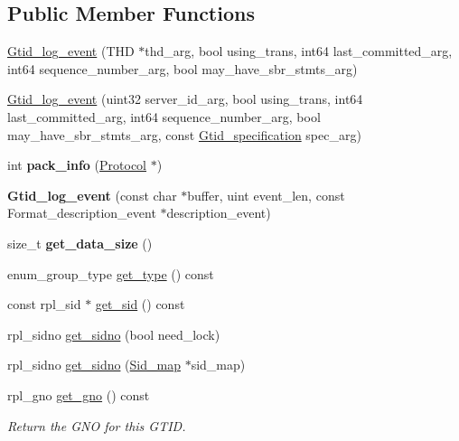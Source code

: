 \subsection*{Public Member Functions}
\begin{DoxyCompactItemize}
\item 
\mbox{\hyperlink{classGtid__log__event_af44a16a9c57f246d7b24ceae5fd6e12d}{Gtid\+\_\+log\+\_\+event}} (T\+HD $\ast$thd\+\_\+arg, bool using\+\_\+trans, int64 last\+\_\+committed\+\_\+arg, int64 sequence\+\_\+number\+\_\+arg, bool may\+\_\+have\+\_\+sbr\+\_\+stmts\+\_\+arg)
\item 
\mbox{\hyperlink{classGtid__log__event_ab403082853928b5d966f92a1390852f5}{Gtid\+\_\+log\+\_\+event}} (uint32 server\+\_\+id\+\_\+arg, bool using\+\_\+trans, int64 last\+\_\+committed\+\_\+arg, int64 sequence\+\_\+number\+\_\+arg, bool may\+\_\+have\+\_\+sbr\+\_\+stmts\+\_\+arg, const \mbox{\hyperlink{structGtid__specification}{Gtid\+\_\+specification}} spec\+\_\+arg)
\item 
\mbox{\label{classGtid__log__event_abb55d88b8171f40a4302f615ceca12a3}} 
int {\bfseries pack\+\_\+info} (\mbox{\hyperlink{classProtocol}{Protocol}} $\ast$)
\item 
\mbox{\label{classGtid__log__event_a5543d02614f5fb7bf7dd24778d03e6a2}} 
{\bfseries Gtid\+\_\+log\+\_\+event} (const char $\ast$buffer, uint event\+\_\+len, const Format\+\_\+description\+\_\+event $\ast$description\+\_\+event)
\item 
\mbox{\label{classGtid__log__event_a5f3ec2096a1e50b223614345af452631}} 
size\+\_\+t {\bfseries get\+\_\+data\+\_\+size} ()
\item 
enum\+\_\+group\+\_\+type \mbox{\hyperlink{classGtid__log__event_a3618edb29b6de3fb20a330e6ca5e8e74}{get\+\_\+type}} () const
\item 
const rpl\+\_\+sid $\ast$ \mbox{\hyperlink{classGtid__log__event_a8bd269465a18073057041ecbd7253127}{get\+\_\+sid}} () const
\item 
rpl\+\_\+sidno \mbox{\hyperlink{classGtid__log__event_a0dfb533b61b71021ccf787b5be301a94}{get\+\_\+sidno}} (bool need\+\_\+lock)
\item 
rpl\+\_\+sidno \mbox{\hyperlink{classGtid__log__event_a7786bb44cd2aefec109e3bd09d705dcf}{get\+\_\+sidno}} (\mbox{\hyperlink{classSid__map}{Sid\+\_\+map}} $\ast$sid\+\_\+map)
\item 
\mbox{\label{classGtid__log__event_a7f8e45f12601f4874a37af94fe9ae05a}} 
rpl\+\_\+gno \mbox{\hyperlink{classGtid__log__event_a7f8e45f12601f4874a37af94fe9ae05a}{get\+\_\+gno}} () const
\begin{DoxyCompactList}\small\item\em Return the G\+NO for this G\+T\+ID. \end{DoxyCompactList}\end{DoxyCompactItemize}
